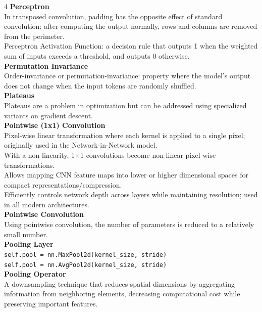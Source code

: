 \documentclass[8pt]{extarticle}
\begin{document}
\begin{multicols}{4}
{\vspace{2pt}\textbf{Perceptron}\\
In transposed convolution, padding has the opposite effect of standard convolution: after computing the output normally, rows and columns are removed from the perimeter.\\
Perceptron Activation Function: a decision rule that outputs 1 when the weighted sum of inputs exceeds a threshold, and outputs 0 otherwise.\\
\vspace{2pt}\textbf{Permutation Invariance}\\
Order-invariance or permutation-invariance: property where the model's output does not change when the input tokens are randomly shuffled.\\
\vspace{2pt}\textbf{Plateaus}\\
Plateaus are a problem in optimization but can be addressed using specialized variants on gradient descent.\\
\vspace{2pt}\textbf{Pointwise (1x1) Convolution}\\
Pixel-wise linear transformation where each kernel is applied to a single pixel; originally used in the Network-in-Network model.\\
With a non-linearity, 1$\times$1 convolutions become non-linear pixel-wise transformations.\\
Allows mapping CNN feature maps into lower or higher dimensional spaces for compact representations/compression.\\
Efficiently controls network depth across layers while maintaining resolution; used in all modern architectures.\\
\vspace{2pt}\textbf{Pointwise Convolution}\\
Using pointwise convolution, the number of parameters is reduced to a relatively small number.\\
\vspace{2pt}\textbf{Pooling Layer}\\
\texttt{self.pool = nn.MaxPool2d(kernel\_{}size, stride)}\\
\texttt{self.pool = nn.AvgPool2d(kernel\_{}size, stride)}\\
\vspace{2pt}\textbf{Pooling Operator}\\
A downsampling technique that reduces spatial dimensions by aggregating information from neighboring elements, decreasing computational cost while preserving important features.\\
}
\end{multicols}
\end{document}
